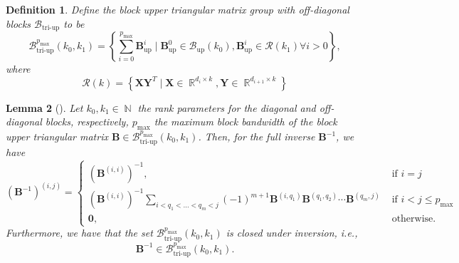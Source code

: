\documentclass[a4paper, 11pt, oneside]{scrartcl}
\theoremstyle{break}
\newtheorem{lemma}{Lemma}[section]
\newtheorem{definition}[lemma]{Definition}
\DeclareMathOperator{\Natural}{\mathbb{N}}
\DeclareMathOperator{\Real}{\mathbb{R}}
\newcommand{\matr}[1]{\boldsymbol{#1}}
\newcommand{\set}[1]{\mathcal{#1}}
\numberwithin{equation}{section}
\begin{document}
				\begin{definition}
					Define the block upper triangular matrix group with off-diagonal blocks $\set{B}_{\text{tri-up}}$ to be
					\begin{equation}
						\set{B}_{\text{tri-up}}^{p_{\text{max}}}(k_0, k_1) = \left \{ \sum_{i=0}^{p_{\text{max}}} \matr{B}_{\text{up}}^i \mid \matr{B}_{\text{up}}^0 \in \set{B}_{\text{up}}(k_0), \matr{B}_{\text{up}}^i \in \set{R}(k_1) \forall i > 0 \right \},
					\end{equation}
					where
					\begin{equation}
						\set{R}(k) = \left \{\matr{X} \matr{Y}^T \mid \matr{X} \in \Real^{d_i \times k}, \matr{Y} \in \Real^{d_{i+1} \times k} \right\}
					\end{equation}
				\end{definition}

				\begin{lemma}[{\parencite[Thm. 1]{FS16}}]
					Let $k_0, k_1 \in \Natural$ the rank parameters for the diagonal and off-diagonal blocks, respectively, $p_{\text{max}}$ the maximum block bandwidth of the block upper triangular matrix $\matr{B} \in \set{B}_{\text{tri-up}}^{p_{\text{max}}}(k_0, k_1)$.
					Then, for the full inverse $\matr{B}^{-1}$, we have
					\begin{equation}
						(\matr{B}^{-1})^{(i, j)} =
						\begin{cases}
							(\matr{B}^{(i, i)})^{-1}, & \text{ if } i = j \\
							(\matr{B}^{(i, i)})^{-1} \sum_{i < q_1 < \ldots < q_m < j} (-1)^{m+1} \matr{B}^{(i, q_1)} \matr{B}^{(q_1, q_2)}  \cdots \matr{B}^{(q_m, j)} & \text{ if } i < j \le p_{\text{max}} \\
							\matr{0}, & \text{ otherwise}.
						\end{cases}
					\end{equation}
					Furthermore, we have that the set $\set{B}_{\text{tri-up}}^{p_{\text{max}}}(k_0, k_1)$ is closed under inversion, i.e.,
					\begin{equation}
						\matr{B}^{-1} \in \set{B}_{\text{tri-up}}^{p_{\text{max}}}(k_0, k_1).
					\end{equation}
				\end{lemma}
\end{document}
